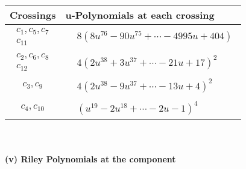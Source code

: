 \documentclass[1p]{elsarticle_modified}
\theoremstyle{definition}
\begin{document}
\begin{tabular}{m{50pt}|m{274pt}}
Crossings & \hspace{64pt}u-Polynomials at each crossing \\
\hline $$\begin{aligned}c_{1},c_{5},c_{7}\\c_{11}\end{aligned}$$&$\begin{aligned}
&8(8 u^{76}-90 u^{75}+\cdots-4995 u+404)
\end{aligned}$\\
\hline $$\begin{aligned}c_{2},c_{6},c_{8}\\c_{12}\end{aligned}$$&$\begin{aligned}
&4(2 u^{38}+3 u^{37}+\cdots-21 u+17)^{2}
\end{aligned}$\\
\hline $$\begin{aligned}c_{3},c_{9}\end{aligned}$$&$\begin{aligned}
&4(2 u^{38}-9 u^{37}+\cdots-13 u+4)^{2}
\end{aligned}$\\
\hline $$\begin{aligned}c_{4},c_{10}\end{aligned}$$&$\begin{aligned}
&(u^{19}-2 u^{18}+\cdots-2 u-1)^{4}
\end{aligned}$\\
\hline
\end{tabular}\\~\\
\newpage\renewcommand{\arraystretch}{1}
\flushleft \textbf{(v) Riley Polynomials at the component}\newline \\
\end{document}
